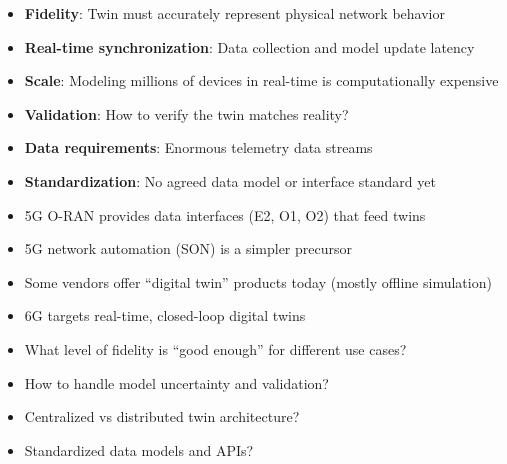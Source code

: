 
\begin{itemize}
\tightlist
\item
  \textbf{Fidelity}: Twin must accurately represent physical network behavior
\item
  \textbf{Real-time synchronization}: Data collection and model update latency
\item
  \textbf{Scale}: Modeling millions of devices in real-time is computationally expensive
\item
  \textbf{Validation}: How to verify the twin matches reality?
\item
  \textbf{Data requirements}: Enormous telemetry data streams
\item
  \textbf{Standardization}: No agreed data model or interface standard yet
\end{itemize}


\begin{itemize}
\tightlist
\item
  5G O-RAN provides data interfaces (E2, O1, O2) that feed twins
\item
  5G network automation (SON) is a simpler precursor
\item
  Some vendors offer ``digital twin'' products today (mostly offline simulation)
\item
  6G targets real-time, closed-loop digital twins
\end{itemize}


\begin{itemize}
\tightlist
\item
  What level of fidelity is ``good enough'' for different use cases?
\item
  How to handle model uncertainty and validation?
\item
  Centralized vs distributed twin architecture?
\item
  Standardized data models and APIs?
\end{itemize}



\CNchained{}

\CNchained{}

